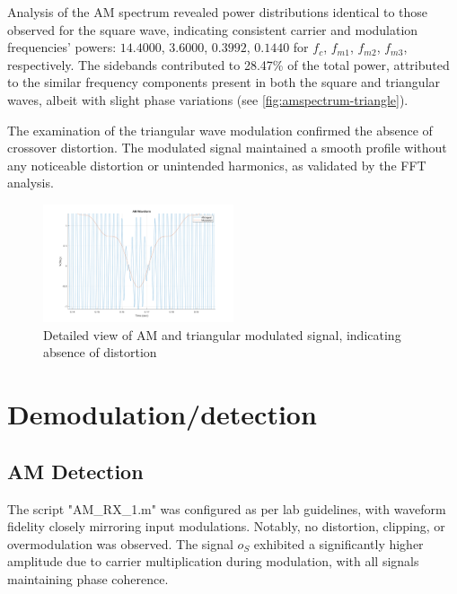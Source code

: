 \documentclass[a4paper, twocolumn]{article}
\begin{document}
        Analysis of the AM spectrum revealed power distributions identical to those observed for the square wave, indicating consistent carrier and modulation frequencies' powers: $14.4000$, $3.6000$, $0.3992$, $0.1440$ for $f_c$, $f_{m1}$, $f_{m2}$, $f_{m3}$, respectively. The sidebands contributed to 28.47\% of the total power, attributed to the similar frequency components present in both the square and triangular waves, albeit with slight phase variations (see \ref{fig:amspectrum-triangle}).
        
        The examination of the triangular wave modulation confirmed the absence of crossover distortion. The modulated signal maintained a smooth profile without any noticeable distortion or unintended harmonics, as validated by the FFT analysis.
        
        \begin{figure}[H]
            \centering
            \includegraphics[width=0.5\textwidth]{Images/AM_RX_1/Triangular Wave/Zoomed.png}
            \caption{Detailed view of AM and triangular modulated signal, indicating absence of distortion}
            \label{fig:zoomed-triangle}
        \end{figure}
        

        \section{Demodulation/detection}

        \subsection{AM Detection}
        The script "AM\_RX\_1.m" was configured as per lab guidelines, with waveform fidelity closely mirroring input modulations. Notably, no distortion, clipping, or overmodulation was observed. The signal $o_S$ exhibited a significantly higher amplitude due to carrier multiplication during modulation, with all signals maintaining phase coherence.
        
\end{document}
